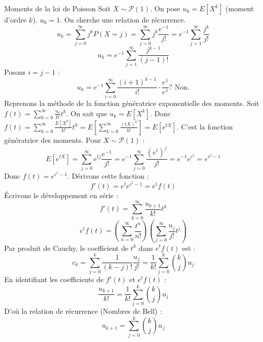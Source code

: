 \begin{correction}{Moments de la loi de Poisson}
Soit $X \sim \mathcal{P}(1)$. On pose $u_k = E[X^k]$ (moment d'ordre $k$).
$u_0 = 1$.
On cherche une relation de récurrence.
$$ u_k = \sum_{j=0}^\infty j^k P(X=j) = \sum_{j=0}^\infty j^k \frac{e^{-1}}{j!} = e^{-1} \sum_{j=1}^\infty \frac{j^k}{j!} $$
$$ u_k = e^{-1} \sum_{j=1}^\infty \frac{j^{k-1}}{(j-1)!} $$
Posons $i = j-1$ :
$$ u_k = e^{-1} \sum_{i=0}^\infty \frac{(i+1)^{k-1}}{i!} \cdot \frac{e^1}{e^1} ? \text{ Non.} $$
Reprenons la méthode de la fonction génératrice exponentielle des moments.
Soit $f(t) = \sum_{k=0}^\infty \frac{u_k}{k!} t^k$.
On sait que $u_k = E[X^k]$.
Donc $f(t) = \sum_{k=0}^\infty \frac{E[X^k]}{k!} t^k = E\left[ \sum_{k=0}^\infty \frac{(tX)^k}{k!} \right] = E[e^{tX}]$.
C'est la fonction génératrice des moments.
Pour $X \sim \mathcal{P}(1)$ :
$$ E[e^{tX}] = \sum_{j=0}^\infty e^{tj} \frac{e^{-1}}{j!} = e^{-1} \sum_{j=0}^\infty \frac{(e^t)^j}{j!} = e^{-1} e^{e^t} = e^{e^t - 1} $$
Donc $f(t) = e^{e^t - 1}$.
Dérivons cette fonction :
$$ f'(t) = e^t e^{e^t - 1} = e^t f(t) $$
Écrivons le développement en série :
$$ f'(t) = \sum_{k=0}^\infty \frac{u_{k+1}}{k!} t^k $$
$$ e^t f(t) = \left( \sum_{n=0}^\infty \frac{t^n}{n!} \right) \left( \sum_{j=0}^\infty \frac{u_j}{j!} t^j \right) $$
Par produit de Cauchy, le coefficient de $t^k$ dans $e^t f(t)$ est :
$$ c_k = \sum_{j=0}^k \frac{1}{(k-j)!} \frac{u_j}{j!} = \frac{1}{k!} \sum_{j=0}^k \binom{k}{j} u_j $$
En identifiant les coefficients de $f'(t)$ et $e^t f(t)$ :
$$ \frac{u_{k+1}}{k!} = \frac{1}{k!} \sum_{j=0}^k \binom{k}{j} u_j $$
D'où la relation de récurrence (Nombres de Bell) :
$$ u_{k+1} = \sum_{j=0}^k \binom{k}{j} u_j $$
\end{correction}


